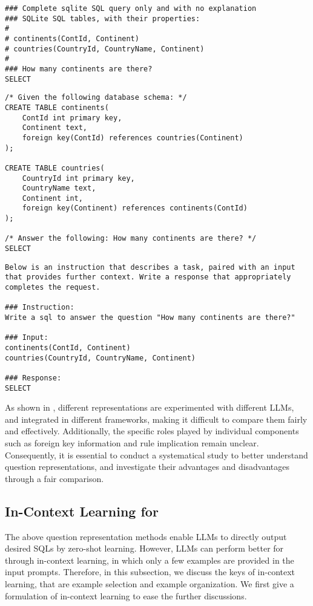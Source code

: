 \begin{lstlisting}[language=Prompt, caption={Example of \openaiprompt}, label={lst:openaiprompt}, float=t]
### Complete sqlite SQL query only and with no explanation
### SQLite SQL tables, with their properties:
# 
# continents(ContId, Continent)
# countries(CountryId, CountryName, Continent)
# 
### How many continents are there?
SELECT
\end{lstlisting}

\begin{lstlisting}[language=Prompt, caption={Example of \sqlprompt}, label={lst:sqlprompt}, float=t]
/* Given the following database schema: */
CREATE TABLE continents(
	ContId int primary key,
    Continent text,
	foreign key(ContId) references countries(Continent)
);

CREATE TABLE countries(
	CountryId int primary key,
    CountryName text,
    Continent int,
	foreign key(Continent) references continents(ContId)
);

/* Answer the following: How many continents are there? */
SELECT 
\end{lstlisting}

\begin{lstlisting}[language=Prompt, caption={Example of \alpacaprompt}, label={lst:alpacaprompt}, float=t
]
Below is an instruction that describes a task, paired with an input that provides further context. Write a response that appropriately completes the request.

### Instruction:
Write a sql to answer the question "How many continents are there?"

### Input:
continents(ContId, Continent)
countries(CountryId, CountryName, Continent)

### Response:
SELECT 
\end{lstlisting}

As shown in , different representations are experimented with different LLMs, and integrated in different frameworks, making it difficult to compare them fairly and effectively. 
Additionally, the specific roles played by individual components such as foreign key information and rule implication remain unclear. 
Consequently, it is essential to conduct a systematical study to better understand question representations, and investigate their advantages and disadvantages through a fair comparison. 

\subsection{In-Context Learning for \nlsql}
The above question representation methods enable LLMs to directly output desired SQLs by zero-shot learning. 
However, LLMs can perform better for \nlsql through in-context learning, in which only a few examples are provided in the input prompts. Therefore, in this subsection, we discuss the keys of in-context learning, that are example selection and example organization. We first give a formulation of in-context learning to ease the further discussions. 

